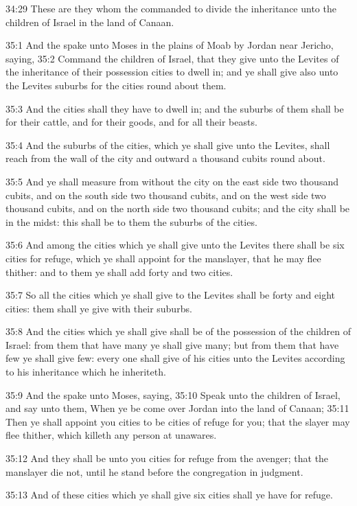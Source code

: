 34:29 These are they whom the \LORD commanded to divide the inheritance unto the children of Israel in the land of Canaan.

35:1 And the \LORD spake unto Moses in the plains of Moab by Jordan near Jericho, saying, 35:2 Command the children of Israel, that they give unto the Levites of the inheritance of their possession cities to dwell in; and ye shall give also unto the Levites suburbs for the cities round about them.

35:3 And the cities shall they have to dwell in; and the suburbs of them shall be for their cattle, and for their goods, and for all their beasts.

35:4 And the suburbs of the cities, which ye shall give unto the Levites, shall reach from the wall of the city and outward a thousand cubits round about.

35:5 And ye shall measure from without the city on the east side two thousand cubits, and on the south side two thousand cubits, and on the west side two thousand cubits, and on the north side two thousand cubits; and the city shall be in the midst: this shall be to them the suburbs of the cities.

35:6 And among the cities which ye shall give unto the Levites there shall be six cities for refuge, which ye shall appoint for the manslayer, that he may flee thither: and to them ye shall add forty and two cities.

35:7 So all the cities which ye shall give to the Levites shall be forty and eight cities: them shall ye give with their suburbs.

35:8 And the cities which ye shall give shall be of the possession of the children of Israel: from them that have many ye shall give many; but from them that have few ye shall give few: every one shall give of his cities unto the Levites according to his inheritance which he inheriteth.

35:9 And the \LORD spake unto Moses, saying, 35:10 Speak unto the children of Israel, and say unto them, When ye be come over Jordan into the land of Canaan; 35:11 Then ye shall appoint you cities to be cities of refuge for you; that the slayer may flee thither, which killeth any person at unawares.

35:12 And they shall be unto you cities for refuge from the avenger; that the manslayer die not, until he stand before the congregation in judgment.

35:13 And of these cities which ye shall give six cities shall ye have for refuge.

